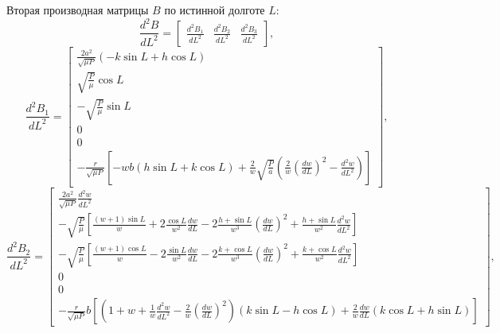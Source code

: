 Вторая производная матрицы $B$ по истинной долготе $L$:
\begin{equation*}
\frac{d^2 B}{dL^2} =
\begin{bmatrix}
    \frac{d^2 B_1}{dL^2} & \frac{d^2 B_2}{dL^2} & \frac{d^2 B_3}{dL^2}
\end{bmatrix},
\end{equation*}
\begin{equation*}
\frac{d^2 B_1}{dL^2} =
    \begin{bmatrix}
        \frac{2a^{2}}{\sqrt{\mu P}} (-k \sin L + h \cos L) \\
        \sqrt{\frac{P}{\mu}} \cos L \\
        -\sqrt{\frac{P}{\mu}} \sin L \\
        0 \\
        0 \\
        -\frac{r}{\sqrt{\mu P}} \left[ -wb (h \sin L + k \cos L) + \frac{2}{w} \sqrt{\frac{P}{a}}
        \left( \frac{2}{w} \left( \frac{dw}{dL} \right)^2 - \frac{d^2 w}{dL^2} \right) \right]
    \end{bmatrix},
\end{equation*}
\begin{equation*}
\frac{d^2 B_2}{dL^2} =
    \begin{bmatrix}
        \frac{2a^{2}}{\sqrt{\mu P}} \frac{d^2 w}{dL^2} \\
        -\sqrt{\frac{P}{\mu}} \left[ \frac{(w + 1) \sin L}{w} + 2 \frac{\cos L}{w^2} \frac{dw}{dL} -
        2 \frac{h + \sin L}{w^3} \left( \frac{dw}{dL} \right)^2 + \frac{h + \sin L}{w^2} \frac{d^2 w}{dL^2} \right]  \\
        -\sqrt{\frac{P}{\mu}} \left[ \frac{(w + 1) \cos L}{w} - 2 \frac{\sin L}{w^2} \frac{dw}{dL} -
        2 \frac{k + \cos L}{w^3} \left( \frac{dw}{dL} \right)^2 + \frac{k + \cos L}{w^2} \frac{d^2 w}{dL^2} \right]  \\
        0 \\
        0 \\
        -\frac{r}{\sqrt{\mu P}} b \left[ \left( 1 + w + \frac{1}{w} \frac{d^2 w}{dL^2} -
        \frac{2}{w} \left( \frac{dw}{dL} \right)^2 \right) (k \sin L - h \cos L) +
        \frac{2}{w} \frac{dw}{dL} (k \cos L + h \sin L) \right]
    \end{bmatrix},
\end{equation*}

